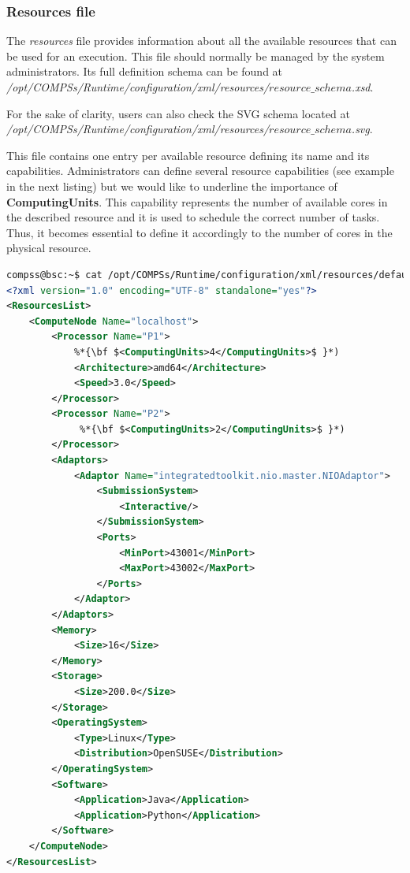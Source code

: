 \subsubsection{Resources file}
The \textit{resources} file provides information about all the available resources that can be used for an execution. 
This file should normally be managed by the system administrators. Its full definition schema can be found at \\
\emph{/opt/COMPSs/Runtime/configuration/xml/resources/$resource\_schema$.xsd}. 

For the sake of clarity, users can also check the SVG schema located at \\
\emph{/opt/COMPSs/Runtime/configuration/xml/resources/$resource\_schema$.svg}.

This file contains one entry per available resource defining its name and its capabilities. Administrators can define several
resource capabilities (see example in the next listing) but we would like to underline the importance of 
\textbf{ComputingUnits}. This capability represents the number of available cores in the described resource and it is
used to schedule the correct number of tasks. Thus, it becomes essential to define it accordingly to the number of cores 
in the physical resource. 

\begin{lstlisting}[language=xml]
compss@bsc:~$ cat /opt/COMPSs/Runtime/configuration/xml/resources/default_resources.xml
<?xml version="1.0" encoding="UTF-8" standalone="yes"?>
<ResourcesList>
    <ComputeNode Name="localhost">
        <Processor Name="P1">
            %*{\bf $<ComputingUnits>4</ComputingUnits>$ }*)
            <Architecture>amd64</Architecture>
            <Speed>3.0</Speed>
        </Processor>
        <Processor Name="P2">
             %*{\bf $<ComputingUnits>2</ComputingUnits>$ }*)
        </Processor>
        <Adaptors>
            <Adaptor Name="integratedtoolkit.nio.master.NIOAdaptor">
                <SubmissionSystem>
                    <Interactive/>
                </SubmissionSystem>
                <Ports>
                    <MinPort>43001</MinPort>
                    <MaxPort>43002</MaxPort>
                </Ports>
            </Adaptor>
        </Adaptors>
        <Memory>
            <Size>16</Size>
        </Memory>
        <Storage>
            <Size>200.0</Size>
        </Storage>
        <OperatingSystem>
            <Type>Linux</Type>
            <Distribution>OpenSUSE</Distribution>
        </OperatingSystem>
        <Software>
            <Application>Java</Application>
            <Application>Python</Application>
        </Software>
    </ComputeNode>
</ResourcesList>
\end{lstlisting}


